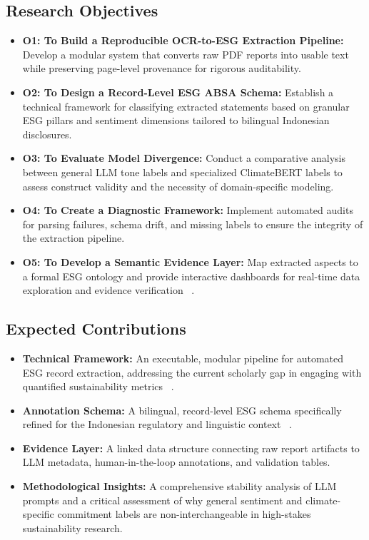 \subsection{Research Objectives}
\begin{itemize}
\item 

\textbf{O1: To Build a Reproducible OCR-to-ESG Extraction Pipeline:} Develop a modular system that converts raw PDF reports into usable text while preserving page-level provenance for rigorous auditability.\item 

\textbf{O2: To Design a Record-Level ESG ABSA Schema:} Establish a technical framework for classifying extracted statements based on granular ESG pillars and sentiment dimensions tailored to bilingual Indonesian disclosures.\item 

\textbf{O3: To Evaluate Model Divergence:} Conduct a comparative analysis between general LLM tone labels and specialized ClimateBERT labels to assess construct validity and the necessity of domain-specific modeling.\item 

\textbf{O4: To Create a Diagnostic Framework:} Implement automated audits for parsing failures, schema drift, and missing labels to ensure the integrity of the extraction pipeline.\item 

\textbf{O5: To Develop a Semantic Evidence Layer:} Map extracted aspects to a formal ESG ontology and provide interactive dashboards for real-time data exploration and evidence verification  ~\cite{ahmad_zaki_49372c30}.
\end{itemize}
\subsection{Expected Contributions}
\begin{itemize}
\item 

\textbf{Technical Framework:} An executable, modular pipeline for automated ESG record extraction, addressing the current scholarly gap in engaging with quantified sustainability metrics  ~\cite{ahmad_zaki_49372c30}.\item 

\textbf{Annotation Schema:} A bilingual, record-level ESG schema specifically refined for the Indonesian regulatory and linguistic context  ~\cite{desi_adhariani_toit_543335d6}.\item 

\textbf{Evidence Layer:} A linked data structure connecting raw report artifacts to LLM metadata, human-in-the-loop annotations, and validation tables.\item 

\textbf{Methodological Insights:} A comprehensive stability analysis of LLM prompts and a critical assessment of why general sentiment and climate-specific commitment labels are non-interchangeable in high-stakes sustainability research.
\end{itemize}
